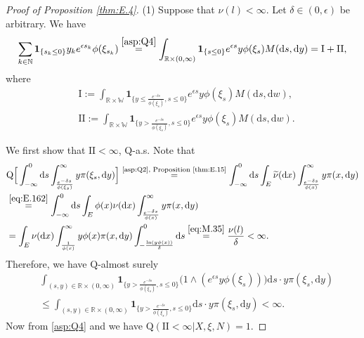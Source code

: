 \documentclass[12pt,a4paper]{amsart}
\numberwithin{equation}{section}
\theoremstyle{plain}
\theoremstyle{definition}
\theoremstyle{remark}
\begin{document}
\begin{proof}[Proof of Proposition \ref{thm:E.4}]
	(1) Suppose that $\nu(l)<\infty$.
Let $\delta\in (0,\epsilon)$ be arbitrary.
	We have
\begin{align}
	\sum_{k\in \mathbb N} \mathbf 1_{\{s_k \leq 0\}} y_k e^{\epsilon s_k} \phi(\xi_{s_k})
	\overset{\eqref{asp:Q4}}=\int_{\mathbb R\times (0,\infty)} \mathbf 1_{\{s\leq 0\}} e^{\epsilon s}y\phi(\xi_{s}) M(\mathrm ds,\mathrm dy)
	= \text{I}+\text{II},
\end{align}
	where
\begin{align}
	&\text{I}
	:=\int_{\mathbb R\times \mathbb W} \mathbf 1_{\{y\leq \frac{e^{-\delta s}}{\phi(\xi_{s})},s\leq 0\}}e^{\epsilon s}y\phi(\xi_{s}) M(\mathrm ds,\mathrm dw),
	\\ & \text{II}
	:= \int_{\mathbb R\times \mathbb W} \mathbf 1_{\{y> \frac{e^{-\delta s}}{\phi(\xi_{s})},s\leq 0\}}e^{\epsilon s}y\phi(\xi_{s}) M(\mathrm ds,\mathrm dw).
\end{align}

We first show that $\text{II}< \infty$, $\mathrm Q$-a.s.
	Note that
\begin{align}
	&\mathrm Q\Big[\int_{-\infty}^0  \mathrm ds \int_{\frac{e^{-\delta s}}{\phi(\xi_{s})}}^\infty y \pi(\xi_s, \mathrm dy) \Big]
	\overset{\text{\eqref{asp:Q2}, Proposition \ref{thm:E.15}}}=\int_{-\infty}^0 \mathrm ds \int_E \widetilde \nu(\mathrm dx)\int_{\frac{e^{-\delta s}}{\phi(x)}}^\infty y\pi(x, \mathrm dy)
	\\&\overset{\eqref{eq:E.162}}=\int_{-\infty}^0 \mathrm ds \int_E \phi(x) \nu(\mathrm dx)\int_{\frac{e^{-\delta s}}{\phi(x)}}^\infty y\pi(x, \mathrm dy)
	\\&= \int_E\nu(\mathrm dx)\int_{\frac{1}{\phi(x)}}^\infty y\phi(x) \pi(x, \mathrm dy)\int_{-\frac{\ln (y\phi(x))}{\delta}}^{0}\mathrm ds
	\overset{\eqref{eq:M.35}}=\frac{\nu(l)}{\delta}
	<\infty.
\end{align}
	Therefore, we have $\mathrm Q$-almost surely
\begin{align}
&\int_{(s,y)\in \mathbb R\times (0,\infty)} \mathbf 1_{\{y> \frac{e^{-\delta s}}{\phi(\xi_{s})},s\leq 0\}} \Big(1\wedge (e^{\epsilon s}y\phi(\xi_{s}))\Big) \mathrm ds \cdot y \pi(\xi_s, \mathrm dy)
	\\&\leq   \int_{(s,y)\in \mathbb R\times (0,\infty)}  \mathbf 1_{\{y> \frac{e^{-\delta s}}{\phi(\xi_{s})},s\leq 0\}} \mathrm ds\cdot y \pi(\xi_s, \mathrm dy)
	< \infty.
\end{align}
	Now from \eqref{asp:Q4} and \cite[Theorem 2.7(i)]{Kyprianou2014Fluctuations} we have $\mathrm Q(\text{II} < \infty | X, \xi, N) = 1$.
	

\end{proof}
\end{document}
